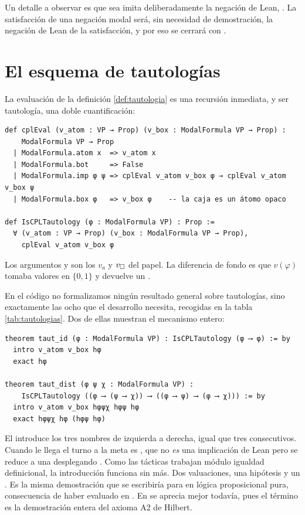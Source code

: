 Un detalle a observar es que  sea  imita deliberadamente la negación de Lean, . La satisfacción de una negación modal será, sin necesidad de demostración, la negación de Lean de la satisfacción, y por eso  se cerrará con .

\section{El esquema de tautologías}\label{sec:form-tautologias}

La evaluación de la definición \ref{def:tautologia} es una recursión inmediata, y ser tautología, una doble cuantificación:

\begin{lstlisting}
def cplEval (v_atom : VP → Prop) (v_box : ModalFormula VP → Prop) :
    ModalFormula VP → Prop
  | ModalFormula.atom x  => v_atom x
  | ModalFormula.bot     => False
  | ModalFormula.imp φ ψ => cplEval v_atom v_box φ → cplEval v_atom v_box ψ
  | ModalFormula.box φ   => v_box φ    -- la caja es un átomo opaco

def IsCPLTautology (φ : ModalFormula VP) : Prop :=
  ∀ (v_atom : VP → Prop) (v_box : ModalFormula VP → Prop),
    cplEval v_atom v_box φ
\end{lstlisting}

Los argumentos  y  son los $v_a$ y $v_\square$ del papel. La diferencia de fondo es que $\hat v(\varphi)$ tomaba valores en $\{0,1\}$ y  devuelve un .

En el código no formalizamos ningún resultado general sobre tautologías, sino exactamente las ocho que el desarrollo necesita, recogidas en la tabla \ref{tab:tautologias}. Dos de ellas muestran el mecanismo entero:

\begin{lstlisting}
theorem taut_id (φ : ModalFormula VP) : IsCPLTautology (φ ⟶ φ) := by
  intro v_atom v_box hφ
  exact hφ

theorem taut_dist (φ ψ χ : ModalFormula VP) :
    IsCPLTautology ((φ ⟶ (ψ ⟶ χ)) ⟶ ((φ ⟶ ψ) ⟶ (φ ⟶ χ))) := by
  intro v_atom v_box hφψχ hφψ hφ
  exact hφψχ hφ (hφψ hφ)
\end{lstlisting}

El  introduce los tres nombres de izquierda a derecha, igual que tres  consecutivos. Cuando le llega el turno a  la meta es , que no \emph{es} una implicación de Lean pero se reduce a una desplegando . Como las tácticas trabajan módulo igualdad definicional, la introducción funciona sin más. Dos valuaciones, una hipótesis y un . Es la misma demostración que se escribiría para  en lógica proposicional pura, consecuencia de haber evaluado en . En  se aprecia mejor todavía, pues el término  es la demostración entera del axioma A2 de Hilbert.

